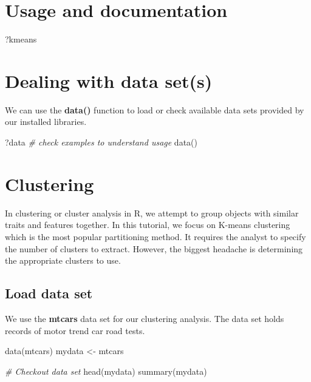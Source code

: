 \documentclass[
]{article}
\newenvironment{Shaded}{\begin{snugshade}}{\end{snugshade}}
\newcommand{\CommentTok}[1]{\textcolor[rgb]{0.56,0.35,0.01}{\textit{#1}}}
\newcommand{\FunctionTok}[1]{\textcolor[rgb]{0.00,0.00,0.00}{#1}}
\newcommand{\NormalTok}[1]{#1}
\newcommand{\OtherTok}[1]{\textcolor[rgb]{0.56,0.35,0.01}{#1}}
\begin{document}
\hypertarget{usage-and-documentation}{%
\section{Usage and documentation}\label{usage-and-documentation}}

\begin{Shaded}
\begin{Highlighting}[]
\NormalTok{?kmeans}
\end{Highlighting}
\end{Shaded}

\hypertarget{dealing-with-data-sets}{%
\section{Dealing with data set(s)}\label{dealing-with-data-sets}}

We can use the \textbf{data()} function to load or check available data
sets provided by our installed libraries.

\begin{Shaded}
\begin{Highlighting}[]
\NormalTok{?data  }\CommentTok{\# check examples to understand usage}
\FunctionTok{data}\NormalTok{()}
\end{Highlighting}
\end{Shaded}

\hypertarget{clustering}{%
\section{Clustering}\label{clustering}}

In clustering or cluster analysis in R, we attempt to group objects with
similar traits and features together. In this tutorial, we focus on
K-means clustering which is the most popular partitioning method. It
requires the analyst to specify the number of clusters to extract.
However, the biggest headache is determining the appropriate clusters to
use.

\hypertarget{load-data-set}{%
\subsection{Load data set}\label{load-data-set}}

We use the \textbf{mtcars} data set for our clustering analysis. The
data set holds records of motor trend car road tests.

\begin{Shaded}
\begin{Highlighting}[]
\FunctionTok{data}\NormalTok{(mtcars)}
\NormalTok{mydata }\OtherTok{\textless{}{-}}\NormalTok{ mtcars}

\CommentTok{\# Checkout data set}
\FunctionTok{head}\NormalTok{(mydata)}
\FunctionTok{summary}\NormalTok{(mydata)}
\end{Highlighting}
\end{Shaded}
\end{document}
